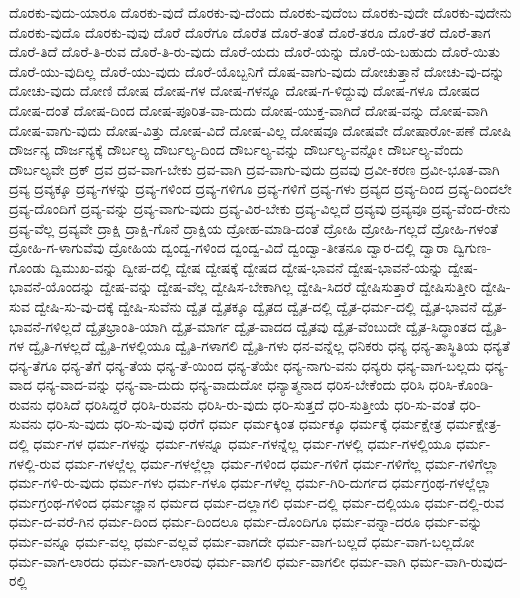 {ದೊರಕು-ವುದು-ಯಾರೂ
ದೊರಕು-ವುದೆ
ದೊರಕು-ವು-ದೆಂದು
ದೊರಕು-ವುದೆಂಬ
ದೊರಕು-ವುದೇ
ದೊರಕು-ವುದೇನು
ದೊರಕು-ವುದೊ
ದೊರಕು-ವುವು
ದೊರೆ
ದೊರೆಗೂ
ದೊರೆತ
ದೊರೆ-ತಂತೆ
ದೊರೆ-ತರೂ
ದೊರೆ-ತರೆ
ದೊರೆ-ತಾಗ
ದೊರೆ-ತಿದೆ
ದೊರೆ-ತಿ-ರುವ
ದೊರೆ-ತಿ-ರು-ವುದು
ದೊರೆ-ಯದು
ದೊರೆ-ಯನ್ನು
ದೊರೆ-ಯ-ಬಹುದು
ದೊರೆ-ಯಿತು
ದೊರೆ-ಯು-ವುದಿಲ್ಲ
ದೊರೆ-ಯು-ವುದು
ದೊರೆ-ಯೊಬ್ಬನಿಗೆ
ದೊಷ-ವಾಗು-ವುದು
ದೋಚುತ್ತಾನೆ
ದೋಚು-ವು-ದನ್ನು
ದೋಚು-ವುದು
ದೋಣಿ
ದೋಷ
ದೋಷ-ಗಳ
ದೋಷ-ಗಳನ್ನೂ
ದೋಷ-ಗ-ಳಿದ್ದುವು
ದೋಷ-ಗಳೂ
ದೋಷದ
ದೋಷ-ದಂತೆ
ದೋಷ-ದಿಂದ
ದೋಷ-ಪೂರಿತ-ವಾ-ದುದು
ದೋಷ-ಯುಕ್ತ-ವಾಗಿದೆ
ದೋಷ-ವನ್ನು
ದೋಷ-ವಾಗಿ
ದೋಷ-ವಾಗು-ವುದು
ದೋಷ-ವಿತ್ತು
ದೋಷ-ವಿದೆ
ದೋಷ-ವಿಲ್ಲ
ದೋಷವೂ
ದೋಷವೇ
ದೋಷಾರೋ-ಪಣೆ
ದೋಷಿ
ದೌರ್ಜನ್ಯ
ದೌರ್ಜನ್ಯಕ್ಕೆ
ದೌರ್ಬಲ್ಯ
ದೌರ್ಬಲ್ಯ-ದಿಂದ
ದೌರ್ಬಲ್ಯ-ವನ್ನು
ದೌರ್ಬಲ್ಯ-ವನ್ನೋ
ದೌರ್ಬಲ್ಯ-ವೆಂದು
ದೌರ್ಬಲ್ಯವೇ
ದ್ರಕ್
ದ್ರವ
ದ್ರವ-ವಾಗ-ಬೇಕು
ದ್ರವ-ವಾಗಿ
ದ್ರವ-ವಾಗು-ವುದು
ದ್ರವವು
ದ್ರವೀ-ಕರಣ
ದ್ರವೀ-ಭೂತ-ವಾಗಿ
ದ್ರವ್ಯ
ದ್ರವ್ಯಕ್ಕೂ
ದ್ರವ್ಯ-ಗಳನ್ನು
ದ್ರವ್ಯ-ಗಳಿಂದ
ದ್ರವ್ಯ-ಗಳಿಗೂ
ದ್ರವ್ಯ-ಗಳಿಗೆ
ದ್ರವ್ಯ-ಗಳು
ದ್ರವ್ಯದ
ದ್ರವ್ಯ-ದಿಂದ
ದ್ರವ್ಯ-ದಿಂದಲೇ
ದ್ರವ್ಯ-ದೊಂದಿಗೆ
ದ್ರವ್ಯ-ವನ್ನು
ದ್ರವ್ಯ-ವಾಗು-ವುದು
ದ್ರವ್ಯ-ವಿರ-ಬೇಕು
ದ್ರವ್ಯ-ವಿಲ್ಲದೆ
ದ್ರವ್ಯವು
ದ್ರವ್ಯವೂ
ದ್ರವ್ಯ-ವೆಂದ-ರೇನು
ದ್ರವ್ಯ-ವೆಲ್ಲ
ದ್ರವ್ಯವೇ
ದ್ರಾಕ್ಷಿ
ದ್ರಾಕ್ಷಿ-ಗೊನೆ
ದ್ರಾಕ್ಷಿಯ
ದ್ರೋಹ-ಮಾಡಿ-ದಂತೆ
ದ್ರೋಹಿ
ದ್ರೋಹಿ-ಗಲ್ಲದೆ
ದ್ರೋಹಿ-ಗಳಂತೆ
ದ್ರೋಹಿ-ಗ-ಳಾಗುವೆವು
ದ್ರೋಹಿಯ
ದ್ವಂದ್ವ-ಗಳಿಂದ
ದ್ವಂದ್ವ-ವಿದೆ
ದ್ವಂದ್ವಾ-ತೀತನೂ
ದ್ವಾರ-ದಲ್ಲಿ
ದ್ವಾರಾ
ದ್ವಿಗುಣ-ಗೊಂಡು
ದ್ವಿಮುಖ-ವನ್ನು
ದ್ವೀಪ-ದಲ್ಲಿ
ದ್ವೇಷ
ದ್ವೇಷಕ್ಕೆ
ದ್ವೇಷದ
ದ್ವೇಷ-ಭಾವನೆ
ದ್ವೇಷ-ಭಾವನೆ-ಯನ್ನು
ದ್ವೇಷ-ಭಾವನೆ-ಯೊಂದನ್ನು
ದ್ವೇಷ-ವನ್ನು
ದ್ವೇಷ-ವೆಲ್ಲ
ದ್ವೇಷಿಸ-ಬೇಕಾಗಿಲ್ಲ
ದ್ವೇಷಿ-ಸಿದರೆ
ದ್ವೇಷಿಸುತ್ತಾರೆ
ದ್ವೇಷಿಸುತ್ತೀರಿ
ದ್ವೇಷಿ-ಸುವ
ದ್ವೇಷಿ-ಸು-ವು-ದಕ್ಕೆ
ದ್ವೇಷಿ-ಸುವೆನು
ದ್ವೈತ
ದ್ವೈತಕ್ಕೂ
ದ್ವೈತದ
ದ್ವೈತ-ದಲ್ಲಿ
ದ್ವೈತ-ಧರ್ಮ-ದಲ್ಲಿ
ದ್ವೈತ-ಭಾವನೆ
ದ್ವೈತ-ಭಾವನೆ-ಗಳಿಲ್ಲದೆ
ದ್ವೈತಭ್ರಾಂತಿ-ಯಾಗಿ
ದ್ವೈತ-ಮಾರ್ಗ
ದ್ವೈತ-ವಾದದ
ದ್ವೈತವು
ದ್ವೈತ-ವೆಂಬುದೇ
ದ್ವೈತ-ಸಿದ್ಧಾಂತದ
ದ್ವೈತಿ-ಗಳ
ದ್ವೈತಿ-ಗಳಲ್ಲದೆ
ದ್ವೈತಿ-ಗಳಲ್ಲಿಯೂ
ದ್ವೈತಿ-ಗಳಾಗಲಿ
ದ್ವೈತಿ-ಗಳು
ಧನ-ವನ್ನೆಲ್ಲ
ಧನಿಕರು
ಧನ್ಯ
ಧನ್ಯ-ತಾಸ್ಥಿತಿಯ
ಧನ್ಯತೆ
ಧನ್ಯ-ತೆಗೂ
ಧನ್ಯ-ತೆಗೆ
ಧನ್ಯ-ತೆಯ
ಧನ್ಯ-ತೆ-ಯಿಂದ
ಧನ್ಯ-ತೆಯೇ
ಧನ್ಯ-ನಾಗು-ವನು
ಧನ್ಯರು
ಧನ್ಯ-ವಾಗ-ಬಲ್ಲದು
ಧನ್ಯ-ವಾದ
ಧನ್ಯ-ವಾದ-ವನ್ನು
ಧನ್ಯ-ವಾ-ದುದು
ಧನ್ಯ-ವಾದುದೋ
ಧನ್ಯಾತ್ಮನಾದ
ಧರಿಸ-ಬೇಕೆಂದು
ಧರಿಸಿ
ಧರಿಸಿ-ಕೊಂಡಿ-ರುವನು
ಧರಿಸಿದೆ
ಧರಿಸಿದ್ದರೆ
ಧರಿಸಿ-ರುವನು
ಧರಿಸಿ-ರು-ವುದು
ಧರಿ-ಸುತ್ತದೆ
ಧರಿ-ಸುತ್ತೀಯೆ
ಧರಿ-ಸು-ವಂತೆ
ಧರಿ-ಸುವನು
ಧರಿ-ಸು-ವುದು
ಧರಿ-ಸು-ವುವು
ಧರೆಗೆ
ಧರ್ಮ
ಧರ್ಮಕ್ಕಿಂತ
ಧರ್ಮಕ್ಕೂ
ಧರ್ಮಕ್ಕೆ
ಧರ್ಮಕ್ಷೇತ್ರ
ಧರ್ಮಕ್ಷೇತ್ರ-ದಲ್ಲಿ
ಧರ್ಮ-ಗಳ
ಧರ್ಮ-ಗಳನ್ನು
ಧರ್ಮ-ಗಳನ್ನೂ
ಧರ್ಮ-ಗಳನ್ನೆಲ್ಲ
ಧರ್ಮ-ಗಳಲ್ಲಿ
ಧರ್ಮ-ಗಳಲ್ಲಿಯೂ
ಧರ್ಮ-ಗಳಲ್ಲಿ-ರುವ
ಧರ್ಮ-ಗಳಲ್ಲೆಲ್ಲ
ಧರ್ಮ-ಗಳಲ್ಲೆಲ್ಲಾ
ಧರ್ಮ-ಗಳಿಂದ
ಧರ್ಮ-ಗಳಿಗೆ
ಧರ್ಮ-ಗಳಿಗೆಲ್ಲ
ಧರ್ಮ-ಗಳಿಗೆಲ್ಲಾ
ಧರ್ಮ-ಗಳಿ-ರು-ವುದು
ಧರ್ಮ-ಗಳು
ಧರ್ಮ-ಗಳೂ
ಧರ್ಮ-ಗಳೆಲ್ಲ
ಧರ್ಮ-ಗಿರಿ-ದುರ್ಗದ
ಧರ್ಮಗ್ರಂಥ-ಗಳಲ್ಲೆಲ್ಲಾ
ಧರ್ಮಗ್ರಂಥ-ಗಳಿಂದ
ಧರ್ಮಜ್ಞಾನ
ಧರ್ಮದ
ಧರ್ಮ-ದಲ್ಲಾಗಲಿ
ಧರ್ಮ-ದಲ್ಲಿ
ಧರ್ಮ-ದಲ್ಲಿಯೂ
ಧರ್ಮ-ದಲ್ಲಿ-ರುವ
ಧರ್ಮ-ದ-ವರೆ-ಗಿನ
ಧರ್ಮ-ದಿಂದ
ಧರ್ಮ-ದಿಂದಲೂ
ಧರ್ಮ-ದೊಂದಿಗೂ
ಧರ್ಮ-ವನ್ನಾ-ದರೂ
ಧರ್ಮ-ವನ್ನು
ಧರ್ಮ-ವನ್ನೂ
ಧರ್ಮ-ವಲ್ಲ
ಧರ್ಮ-ವಲ್ಲವೆ
ಧರ್ಮ-ವಾಗದೇ
ಧರ್ಮ-ವಾಗ-ಬಲ್ಲದೆ
ಧರ್ಮ-ವಾಗ-ಬಲ್ಲದೋ
ಧರ್ಮ-ವಾಗ-ಲಾರದು
ಧರ್ಮ-ವಾಗ-ಲಾರವು
ಧರ್ಮ-ವಾಗಲಿ
ಧರ್ಮ-ವಾಗಲೀ
ಧರ್ಮ-ವಾಗಿ
ಧರ್ಮ-ವಾಗಿ-ರುವುದ-ರಲ್ಲಿ
}
